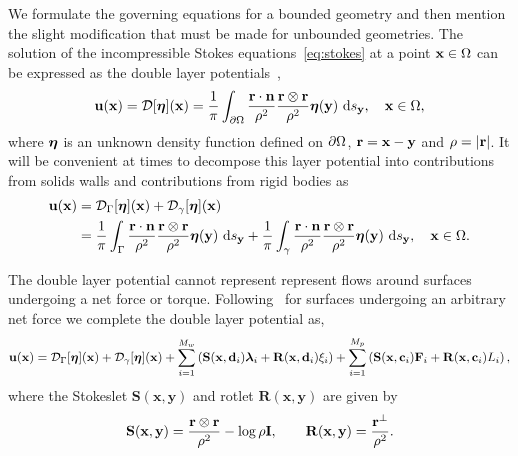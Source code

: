 \documentclass[preprint, 10pt]{elsarticle}
\begin{document}
We formulate the governing equations for a bounded geometry and then
mention the slight modification that must be made for unbounded
geometries.  The solution of the incompressible Stokes
equations~\eqref{eq:stokes} at a point ${\mathbf{x}} \in \Omega$ can be expressed
as the double layer potentials~\cite{Ladyzhenskaya1963, Pozrikidis1992},
\begin{align}
  \label{eq:dlp}
  {\mathbf{u}}({\mathbf{x}}) = {\mathcal{D}}[{\boldsymbol\eta}]({\mathbf{x}}) = \frac{1}{\pi}\int_{{\partial}\Omega}
  \frac{{\mathbf{r}}\cdot\mathbf{n}}{\rho^2}\frac{{\mathbf{r}} \otimes {\mathbf{r}}}{\rho^2}
  {\boldsymbol\eta}({\mathbf{y}})~\text{d}s_{{\mathbf{y}}}, \quad {\mathbf{x}} \in \Omega,
\end{align}
where ${\boldsymbol\eta}$ is an unknown density function defined  on ${\partial}\Omega$,
${\mathbf{r}} = {\mathbf{x}} - {\mathbf{y}}$ and $\rho=|{\mathbf{r}}|$.  It will be convenient at times to
decompose this layer potential into contributions from solids walls and
contributions from rigid bodies as
\begin{align*}
  {\mathbf{u}}({\mathbf{x}}) &= {\mathcal{D}}_\Gamma[{\boldsymbol\eta}]({\mathbf{x}}) + 
              {\mathcal{D}}_\gamma[{\boldsymbol\eta}]({\mathbf{x}}) \\
           &= \frac{1}{\pi}\int_{\Gamma}
              \frac{{\mathbf{r}}\cdot\mathbf{n}}{\rho^2}
              \frac{{\mathbf{r}} \otimes {\mathbf{r}}}{\rho^2}
              {\boldsymbol\eta}({\mathbf{y}})~\text{d}s_{{\mathbf{y}}} + 
              \frac{1}{\pi}\int_{\gamma}
              \frac{{\mathbf{r}}\cdot\mathbf{n}}{\rho^2}
              \frac{{\mathbf{r}} \otimes {\mathbf{r}}}{\rho^2}
              {\boldsymbol\eta}({\mathbf{y}})~\text{d}s_{{\mathbf{y}}}, \quad {\mathbf{x}} \in \Omega.
\end{align*}

The double layer potential cannot represent represent flows around
surfaces undergoing a net force or torque.  Following~\cite{Power1987,
Power1993} for surfaces undergoing an arbitrary net force we complete
the double layer potential as,
\begin{align}
  \label{eq:completed_DLP}
  {\mathbf{u}}({\mathbf{x}}) = {\mathcal{D}}_\Gamma[{\boldsymbol\eta}]({\mathbf{x}}) + {\mathcal{D}}_\gamma[{\boldsymbol\eta}]({\mathbf{x}}) + 
             \sum_{i=1}^{M_w} \left(\mathbf{S}({\mathbf{x}},{\mathbf{d}}_i){\boldsymbol\lambda}_i + 
                \mathbf{R}({\mathbf{x}},{\mathbf{d}}_i)\xi_i\right) + 
             \sum_{i=1}^{M_p} \left(\mathbf{S}({\mathbf{x}},{\mathbf{c}}_i){\mathbf{F}}_i + 
                \mathbf{R}({\mathbf{x}},{\mathbf{c}}_i)L_i\right),
\end{align}
where the Stokeslet $\mathbf{S}(\mathbf{x},\mathbf{y})$ and rotlet
$\mathbf{R}(\mathbf{x},\mathbf{y})$ are given by
\begin{align*}
  \mathbf{S}({\mathbf{x}},{\mathbf{y}}) = \frac{{\mathbf{r}} \otimes {\mathbf{r}}}{\rho^2} - 
  \log\rho\mathbf{I}, \qquad 
  \mathbf{R}({\mathbf{x}},{\mathbf{y}}) = \frac{{\mathbf{r}}^\perp}{\rho^2}.
\end{align*}
\end{document}
